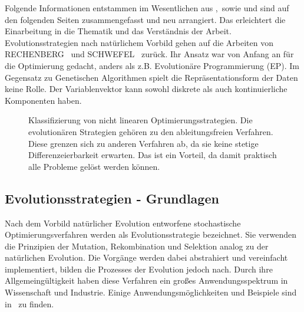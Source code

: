 \label{seq:EvolutionaryStrategies}
Folgende Informationen entstammen im Wesentlichen aus \cite[Kapitel 7]{kost2003optimierung},\cite{bronstejn2012taschenbuch}\ sowie \cite{Hansen:1} und sind auf den folgenden Seiten zusammengefasst und neu arrangiert. Das erleichtert die Einarbeitung in die Thematik und das Verständnis der Arbeit. Evolutionsstrategien nach natürlichem Vorbild gehen auf die Arbeiten von RECHENBERG~\cite{Rechenberg3} und SCHWEFEL~\cite{Schwefel2} zurück. Ihr Ansatz war von Anfang an für die Optimierung gedacht, anders als z.B. Evolutionäre Programmierung (EP). Im Gegensatz zu Genetischen Algorithmen spielt die Repräsentationsform der Daten keine Rolle. Der Variablenvektor kann sowohl diskrete als auch kontinuierliche Komponenten haben. 
%
%
\begin{figure}[ht!]
	\centering
	\caption[Übersicht nichtlinearer Optimierungsstrategien]{ Klassifizierung von nicht linearen Optimierungsstrategien. Die evolutionären Strategien gehören zu den ableitungsfreien Verfahren. Diese grenzen sich zu anderen Verfahren ab, da sie keine stetige Differenzeierbarkeit erwarten. Das ist ein Vorteil, da damit praktisch alle Probleme gelöst werden können. }
	\label{fig:overview_optimizations}
		\vspace{2mm}
	
\end{figure}
%
%
\subsection{Evolutionsstrategien - Grundlagen }
%
Nach dem Vorbild natürlicher Evolution entworfene stochastische Optimierungsverfahren werden als Evolutionsstrategie bezeichnet. Sie verwenden die Prinzipien der Mutation, Rekombination und Selektion analog zu der natürlichen Evolution. Die Vorgänge werden dabei abstrahiert und vereinfacht implementiert, bilden die Prozesses der Evolution jedoch nach. Durch ihre Allgemeingültigkeit haben diese Verfahren ein großes Anwendungsspektrum in Wissenschaft und Industrie. Einige Anwendungsmöglichkeiten und Beispiele sind in~\cite[Kapitel 11]{kost2003optimierung} zu finden. \\


